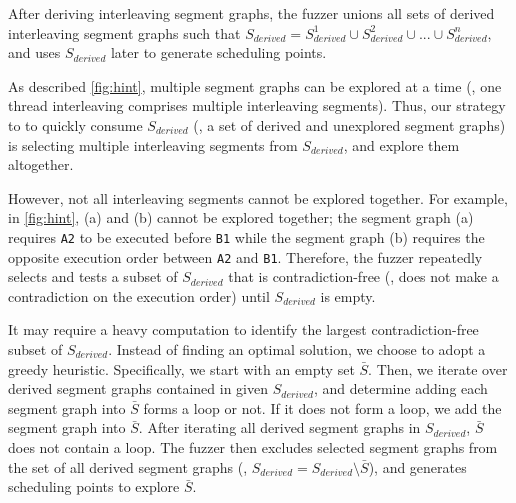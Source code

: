 


After deriving interleaving segment graphs, the fuzzer unions all sets
of derived interleaving segment graphs such that
$S_{derived} = S^{1}_{derived} \cup S^{2}_{derived} \cup ... \cup
S^{n}_{derived}$, and uses $S_{derived}$ later to generate scheduling
points.




%
As described  \autoref{fig:hint}, multiple segment graphs can be
explored at a time (\ie, one thread interleaving comprises multiple
interleaving segments).
%
Thus, our strategy to to quickly consume $S_{derived}$ (\ie, a set of
derived and unexplored segment graphs) is selecting multiple
interleaving segments from $S_{derived}$, and explore them altogether.




However, not all interleaving segments cannot be explored together.
%
For example, in \autoref{fig:hint}, (a) and (b) cannot be explored
together; the segment graph (a) requires \texttt{A2} to be executed
before \texttt{B1} while the segment graph (b) requires the opposite
execution order between \texttt{A2} and \texttt{B1}.
%
Therefore, the fuzzer repeatedly selects and tests a subset of
$S_{derived}$ that is contradiction-free (\ie, does not make a
contradiction on the execution order) until $S_{derived}$ is empty.


It may require a heavy computation to identify the largest
contradiction-free subset of $S_{derived}$.
%
Instead of finding an optimal solution, we choose to adopt a greedy
heuristic.
%
Specifically, we start with an empty set $\bar{S}$. Then, we iterate
over derived segment graphs contained in given $S_{derived}$, and
determine adding each segment graph into $\bar{S}$ forms a loop or
not. If it does not form a loop, we add the segment graph into
$\bar{S}$.
%
After iterating all derived segment graphs in $S_{derived}$, $\bar{S}$
does not contain a loop. The fuzzer then excludes selected segment
graphs from the set of all derived segment graphs (\ie,
$S_{derived} = S_{derived} \setminus \bar{S}$), and generates
scheduling points to explore $\bar{S}$.









